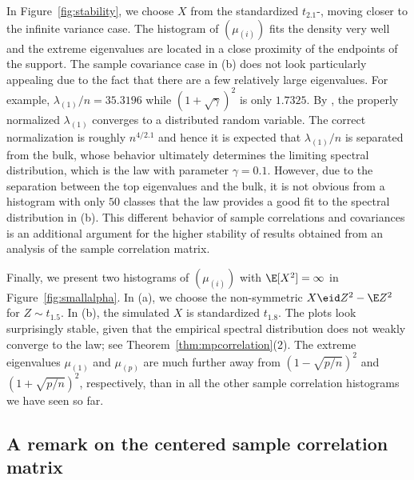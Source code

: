 In Figure~\ref{fig:stability}, we choose $X$ from the standardized
$t_{2.1}$-\ds , moving closer to the infinite variance case. The histogram of $(\mu_{(i)})$ fits the \MP density very well and the extreme eigenvalues are located in a close proximity of the endpoints of the \MP support. The sample covariance case in (b) does not 
look particularly appealing due to the fact that there are a few relatively large eigenvalues. For example, $\lambda_{(1)}/n=35.3196$ while $(1+\sqrt{\gamma})^2$ is only $1.7325$. By \cite{auffinger:arous:peche:2009,heiny:mikosch:2016,davis:mikosch:heiny:xie:2015}, the properly normalized $\lambda_{(1)}$ converges to a \Frechet distributed random variable. The correct normalization is roughly $n^{4/2.1}$ and hence it is expected that $\lambda_{(1)}/n$ is separated from the bulk, whose behavior ultimately determines the limiting spectral distribution, which is the \MP law with parameter $\gamma=0.1$. However, due to the separation between the top eigenvalues and the bulk, it is not obvious from a histogram with only $50$ classes that the \MP law provides a good fit to the spectral distribution in (b). This different behavior of sample correlations and covariances is an additional argument for the higher stability of results obtained from an analysis of the sample correlation matrix.  
\par

Finally, we present two histograms of $(\mu_{(i)})$ with $\E[X^2]=\infty$ in Figure~\ref{fig:smallalpha}. 
In (a), we choose the non-symmetric $X \eid Z^2-\E Z^2$ for $Z\sim t_{1.5}$. 
In (b), the simulated $X$ is standardized $t_{1.8}$. 
The plots look surprisingly stable, given that the empirical spectral distribution 
does not weakly converge to the \MP law; see Theorem~\ref{thm:mpcorrelation}(2). 
The extreme eigenvalues $\mu_{(1)}$ and $\mu_{(p)}$ are much further away from $(1-\sqrt{p/n})^2$ and $(1+\sqrt{p/n})^2$, respectively, than in all the other sample correlation histograms we have seen so far. 





\subsection{A remark on the centered sample correlation matrix}


